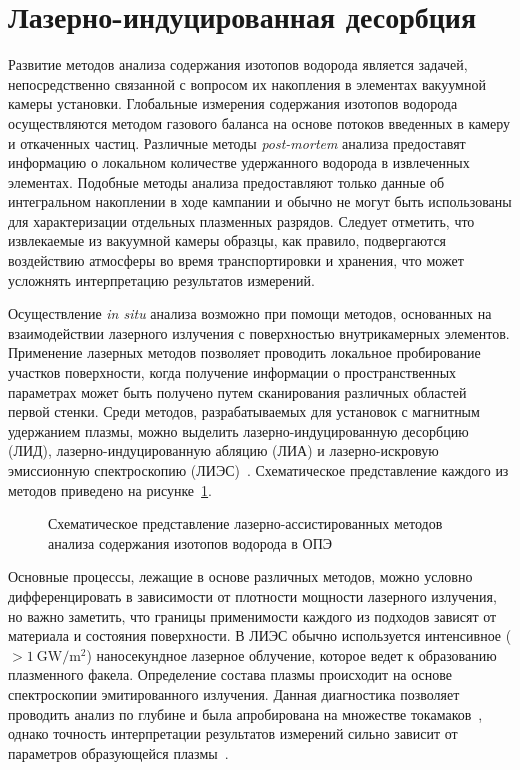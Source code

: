 \section{Лазерно-индуцированная десорбция}\label{sec:ch1/sec6}

Развитие методов анализа содержания изотопов водорода является задачей, непосредственно связанной с вопросом их накопления в элементах вакуумной камеры установки. Глобальные измерения содержания изотопов водорода осуществляются методом газового баланса на основе потоков введенных в камеру и откаченных частиц. Различные методы \textit{post-mortem} анализа предоставят информацию о локальном количестве удержанного водорода в извлеченных элементах. Подобные методы анализа предоставляют только данные об интегральном накоплении в ходе кампании и обычно не могут быть использованы для характеризации отдельных плазменных разрядов. Следует отметить, что извлекаемые из вакуумной камеры образцы, как правило, подвергаются воздействию атмосферы во время транспортировки и хранения, что может усложнять интерпретацию результатов измерений.

Осуществление \textit{in situ} анализа возможно при помощи методов, основанных на взаимодействии лазерного излучения с поверхностью внутрикамерных элементов. Применение лазерных методов позволяет проводить локальное пробирование участков поверхности, когда получение информации о пространственных параметрах может быть получено путем сканирования различных областей первой стенки. Среди методов, разрабатываемых для установок с магнитным удержанием плазмы, можно выделить лазерно-индуцированную десорбцию (ЛИД), лазерно-индуцированную абляцию (ЛИА) и лазерно-искровую эмиссионную спектроскопию (ЛИЭС)~\cite{Philipps2013,Mukhin2016}. Схематическое представление каждого из методов приведено на рисунке~\cref{fig:ch1/laser_methods}.


\begin{figure}[ht]
    \caption{Схематическое представление лазерно-ассистированных методов анализа содержания изотопов водорода в ОПЭ}\label{fig:ch1/laser_methods}
\end{figure}

Основные процессы, лежащие в основе различных методов, можно условно дифференцировать в зависимости от плотности мощности лазерного излучения, но важно заметить, что границы применимости каждого из подходов зависят от материала и состояния поверхности. В ЛИЭС обычно используется интенсивное (\( >\SI{1}{\giga\watt\per\meter\squared} \)) наносекундное лазерное облучение, которое ведет к образованию плазменного факела. Определение состава плазмы происходит на основе спектроскопии эмитированного излучения. Данная диагностика позволяет проводить анализ по глубине и была апробирована на множестве токамаков~\cite{Xiao2015,Semerok2016,Imran2023,Favre2024}, однако точность интерпретации результатов измерений сильно зависит от параметров образующейся плазмы~\cite{Marenkov2021}. 


